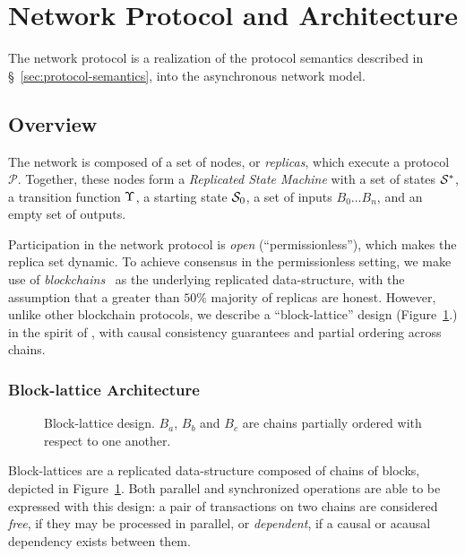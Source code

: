 \section{Network Protocol and Architecture}

The \oscoin{} network protocol is a realization of the protocol semantics
described in \S~\ref{sec:protocol-semantics}, into the asynchronous network
model.

\subsection{Overview}

The \oscoin{} network is composed of a set of nodes, or \emph{replicas}, which
execute a protocol $\mathcal{P}$. Together, these nodes form a \emph{Replicated
State Machine} with a set of states $\mathcal{S}^*$, a transition function $\Upsilon$,
a starting state $\mathcal{S}_0$, a set of inputs $B_0 \dotso B_n$, and an empty set
of outputs.


Participation in the network protocol is \emph{open} (\ie ``permissionless''),
which makes the replica set dynamic. To achieve consensus in the permissionless
setting, we make use of \emph{blockchains}~\cite{bitcoin} as the underlying
replicated data-structure, with the assumption that a greater than $50\%$
majority of replicas are honest.  However, unlike other blockchain protocols,
we describe a ``block-lattice'' design (Figure~\ref{block-lattice}.) in the
spirit of \cite{raiblocks}, with causal consistency guarantees
\cite{causal-consistency} and partial ordering across chains.

\subsubsection{Block-lattice Architecture}

\begin{figure}[hbp]
    
    \caption{Block-lattice design. $B_a$, $B_b$ and $B_c$ are chains partially ordered with respect to one another.\label{block-lattice}}
\end{figure}

Block-lattices are a replicated data-structure composed of chains of blocks,
depicted in Figure~\ref{block-lattice}.  Both parallel and synchronized
operations are able to be expressed with this design:  a pair of transactions
on two chains are considered \emph{free}, if they may be processed in parallel,
or \emph{dependent}, if a causal or acausal dependency exists between them.


